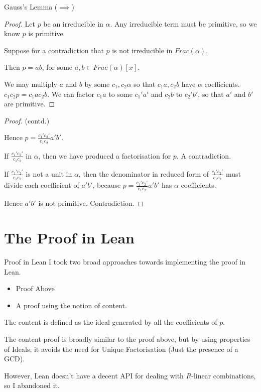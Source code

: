 \documentclass{beamer}
\begin{document}
\begin{frame}{Gauss's Lemma {($\implies$)}}

  \begin{proof}

    Let $p$ be an irreducible in $\alpha$. Any irreducible term must be primitive, so we know $p$ is primitive. 

    Suppose for a contradiction that $p$ is not irreducible in $Frac (\alpha)$. 

    Then $p = ab$, for some $a,b \in Frac (\alpha)[x]$. 

    We may multiply $a$ and $b$ by some $c_1,c_2 \alpha$ so that $c_1a,c_2b$ have $\alpha$ coefficients. $c_1c_2p = c_1ac_2b$. 
    We can factor $c_1a$ to some $c_1'a'$ and $c_2b$ to $c_2'b'$, so that $a'$ and $b'$ are primitive. 


  \end{proof}
  
\end{frame}

\begin{frame}
  \begin{proof} (contd.)
    
    Hence $p = \frac{c_1'c_2'}{c_1c_2}a'b'$.

    If $\frac{c_1'c_2'}{c_1c_2}$ in $\alpha$, then we have produced a factorisation for $p$. A contradiction. 

    If $\frac{c_1'c_2'}{c_1c_2}$ is not a unit in $\alpha$, then the denominator in reduced form of $\frac{c_1'c_2'}{c_1c_2}$ must divide each coefficient of $a'b'$, because $p =  \frac{c_1'c_2'}{c_1c_2}a'b'$ has $\alpha$ coefficients. 
  
    Hence $a'b'$ is not primitive. Contradiction.

  \end{proof}
  
\end{frame}

\section{The Proof in Lean}

\begin{frame}{Proof in Lean}
  I took two broad approaches towards implementing the proof in Lean. 

  \begin{itemize}
    \item Proof Above 
    \item A proof using the notion of content. 
  \end{itemize}

  The content is defined as the ideal generated by all the coefficients of $p$. 
  
  The content proof is broadly similar to the proof above, but by using properties of Ideals, it avoids the need for Unique Factorisation (Just the presence of a GCD). 

  However, Lean doesn't have a decent API for dealing with $R$-linear combinations, so I abandoned it. 

\end{frame}
\end{document}
